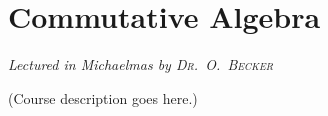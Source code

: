 \chapter[Commutative Algebra \\ \textnormal{\emph{Lectured in Michaelmas \oldstylenums{2023} by \textsc{Dr.\ O.\ Becker}}}]{Commutative Algebra}
\emph{\Large Lectured in Michaelmas  by \textsc{Dr.\ O.\ Becker}}

(Course description goes here.)


